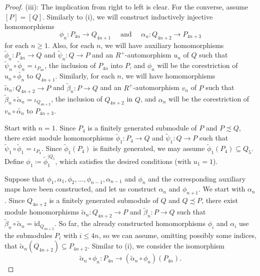 \documentclass[11pt]{amsart}
\numberwithin{equation}{section}
\theoremstyle{definition}
\theoremstyle{plain}
\theoremstyle{definition}
\begin{document}
\begin{proof}
(iii): The implication from right to left is clear. For the converse, assume $[P] = [Q]$. Similarly to (i), we will construct inductively injective homomorphisms 
\begin{equation*}
    \phi_n \colon P_{4n} \rightarrow Q_{4n + 1} \quad \text{ and } \quad \alpha_n \colon Q_{4n + 2} \rightarrow P_{4n + 3}
\end{equation*}
for each $n \geq 1$. Also, for each $n$, we will have auxiliary homomorphisms $\tilde{\phi}_n \colon P_{4n} \rightarrow Q$ and $\tilde{\psi}_n \colon Q \rightarrow P$ and an $R^+$-automorphism $u_n$ of $Q$ such that $\tilde{\psi}_n \circ \tilde{\phi}_n = \iota_{P_{4n}}$, the inclusion of $P_{4n}$ into $P$, and $\phi_n$ will be the corestriction of $u_n \circ \tilde{\phi_n}$ to $Q_{4n + 1}$. Similarly, for each $n$, we will have homomorphisms $\tilde{\alpha}_n \colon Q_{4n+2} \rightarrow P$ and $\tilde{\beta}_n \colon P \rightarrow Q$ and an $R^+$-automorphism $v_n$ of $P$ such that $\tilde{\beta}_n \circ \tilde{\alpha}_n = \iota_{Q_{4n +2}}$, the inclusion of $Q_{4n+2}$ in $Q$, and $\alpha_n$ will be the corestriction of $v_n \circ \tilde{\alpha_n}$ to $P_{4n + 3}$. 

Start with $n = 1$. Since $P_4$ is a finitely generated submodule of $P$ and $P \precsim Q$, there exist module homomorphisms $\tilde{\phi}_1 \colon P_4 \rightarrow Q$ and $\tilde{\psi}_1 \colon Q \rightarrow P$ such that $\tilde{\psi}_1 \circ \tilde{\phi}_1 = \iota_{P_4}$. Since $\tilde{\phi}_1(P_4)$ is finitely generated, we may assume $\tilde{\phi}_1(P_4) \subseteq Q_5$. Define $\phi_1 \coloneqq \tilde{\phi}_1^{|Q_5}$, which satisfies the desired conditions (with $u_1=1$). 

Suppose that $\phi_1, \alpha_1, \phi_2, \dots, \phi_{n-1}, \alpha_{n-1}$ and $\phi_{n}$ and the corresponding auxiliary maps have been constructed, and let us construct $\alpha_{n}$ and $\phi_{n+1}$. We start with $\alpha_n$. Since $Q_{4n + 2}$ is a finitely generated submodule of $Q$ and $Q \precsim P$, there exist module homomorphisms $\tilde{\alpha}_n \colon Q_{4n + 2} \rightarrow P$ and $\tilde{\beta}_n \colon P \rightarrow Q$ such that $\tilde{\beta}_n \circ \tilde{\alpha}_n = \mathrm{id}_{Q_{4n + 2}}$. So far, the already constructed homomorphisms $\phi_i$ and $\alpha_i$ use the submodules $P_i$ with $i \leq 4n$, so we can assume, omitting possibly some indices, that $\tilde{\alpha}_n(Q_{4n + 2}) \subseteq P_{4n + 2}$. Similar to (i), we consider the isomorphism 
\begin{equation*}
    \tilde{\alpha}_n\circ\phi_n \colon P_{4n} \rightarrow (\tilde{\alpha}_n\circ\phi_n)(P_{4n}).
\end{equation*}


\end{proof}
\end{document}
